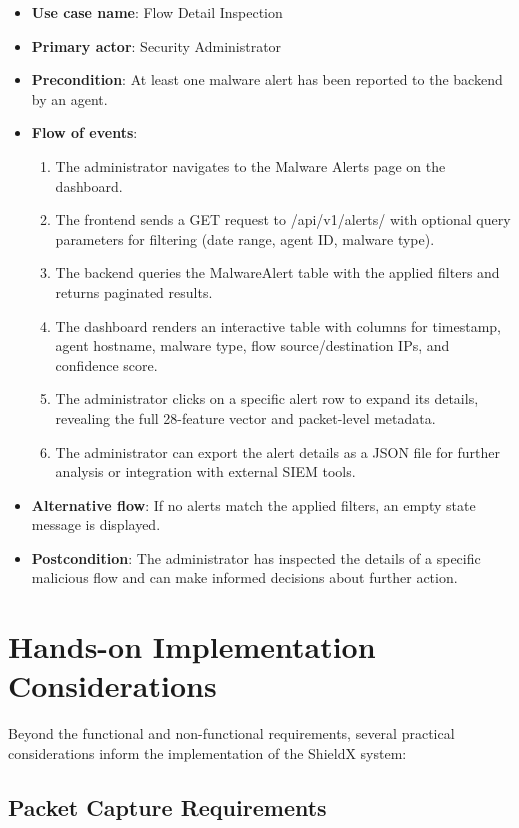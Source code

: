 \documentclass[../Main.tex]{subfiles}
\begin{document}
\begin{itemize}
    \item \textbf{Use case name}: Flow Detail Inspection
    \item \textbf{Primary actor}: Security Administrator
    \item \textbf{Precondition}: At least one malware alert has been reported to the backend by an agent.
    \item \textbf{Flow of events}:
        \begin{enumerate}
            \item The administrator navigates to the Malware Alerts page on the dashboard.
            \item The frontend sends a GET request to /api/v1/alerts/ with optional query parameters for filtering (date range, agent ID, malware type).
            \item The backend queries the MalwareAlert table with the applied filters and returns paginated results.
            \item The dashboard renders an interactive table with columns for timestamp, agent hostname, malware type, flow source/destination IPs, and confidence score.
            \item The administrator clicks on a specific alert row to expand its details, revealing the full 28-feature vector and packet-level metadata.
            \item The administrator can export the alert details as a JSON file for further analysis or integration with external SIEM tools.
        \end{enumerate}
    \item \textbf{Alternative flow}: If no alerts match the applied filters, an empty state message is displayed.
    \item \textbf{Postcondition}: The administrator has inspected the details of a specific malicious flow and can make informed decisions about further action.
\end{itemize}

\section{Hands-on Implementation Considerations}
\label{section:2.4}

Beyond the functional and non-functional requirements, several practical considerations inform the implementation of the ShieldX system:

\subsection{Packet Capture Requirements}
\end{document}
